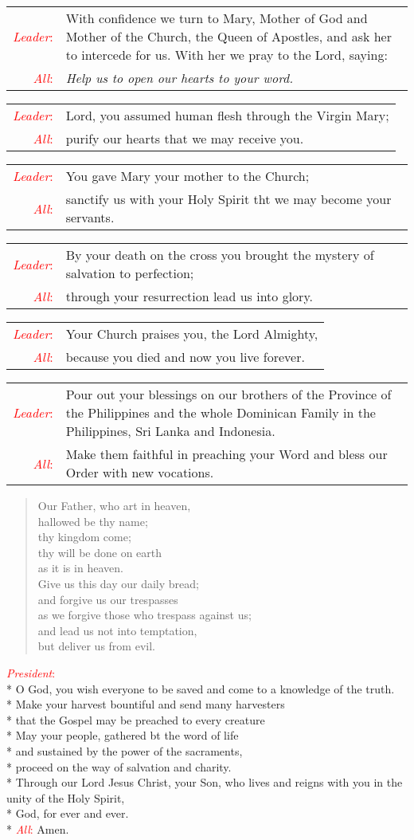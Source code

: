 \documentclass[letterpaper,14pt]{extarticle}
\newcommand{\side}[1]{\flagverse{\textcolor{red}{\textit{#1}}:}}
\newcommand{\sidestar}[1]{\textcolor{red}{\textit{#1}:}}
\newlength{\oldindent}
\newcommand{\antiphon}[2]{
	\setlength{\oldindent}{\vindent}
	\setlength{\vindent}{0em}
	\begin{verse}
	\side{#1} \textbf{#2}
	\end{verse}
	\setlength{\vindent}{\oldindent}
}
\newcommand{\intercession}[2]{
	\begin{tabular}[h]{r p{4.25in}}
		\sidestar{Leader} & #1 \\
		\sidestar{All} & #2
	\end{tabular}}
\begin{document}
\intercession{With confidence we turn to Mary, Mother of God and Mother of the Church, the Queen of Apostles, and ask her to intercede for us. With her we pray to the Lord, saying:}
{\textit{Help us to open our hearts to your word.}}

\intercession{Lord, you assumed human flesh through the Virgin Mary;}
{purify our hearts that we may receive you.}

\intercession{You gave Mary your mother to the Church;}
{sanctify us with your Holy Spirit tht we may become your servants.}

\intercession{By your death on the cross you brought the mystery of salvation to perfection;}
{through your resurrection lead us into glory.}

\intercession{Your Church praises you, the Lord Almighty,}
{because you died and now you live forever.}

\intercession{Pour out your blessings on our brothers of the Province of the Philippines and
the whole Dominican Family in the Philippines, Sri Lanka and Indonesia.}{Make
them faithful in preaching your Word and bless our Order with new vocations.}

	
\begin{verse}
	\side{All} Our Father, who art in heaven,\\ %
hallowed be thy name; \\
thy kingdom come; \\
thy will be done on earth \\
as it is in heaven. \\
Give us this day our daily bread; \\
and forgive us our trespasses \\
as we forgive those who trespass against us; \\
and lead us not into temptation, \\
but deliver us from evil.
\end{verse}


\sidestar{President}\\*
O God, you wish everyone to be saved and come to a knowledge of the truth. \\*
Make your harvest bountiful and send many harvesters \\*
that the Gospel may be preached to every creature \\*
May your people, gathered bt the word of life \\*
and sustained by the power of the sacraments, \\*
proceed on the way of salvation and charity. \\*
Through our Lord Jesus Christ, your Son,
who lives and reigns with you in the unity of the Holy Spirit,\\*
God, for ever and ever.\\*
\sidestar{All} Amen.
\end{document}
